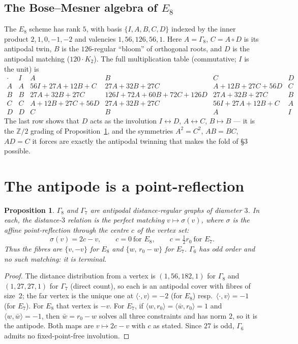 \documentclass[11pt]{article}
\newtheorem{proposition}{Proposition}
\theoremstyle{remark}
\newcommand{\ip}[2]{\langle #1,#2\rangle}
\begin{document}
\subsection*{The Bose--Mesner algebra of $E_8$}

The $E_8$ scheme has rank $5$, with basis $\{I,A,B,C,D\}$ indexed by the inner
product $2,1,0,-1,-2$ and valencies $1,56,126,56,1$. Here $A=\Gamma_8$,
$C=A\circ D$ is its antipodal twin, $B$ is the $126$-regular ``bloom'' of
orthogonal roots, and $D$ is the antipodal matching ($120\cdot K_2$). The full
multiplication table (commutative; $I$ is the unit) is
\[
\renewcommand{\arraystretch}{1.25}
\begin{array}{c|ccccc}
\cdot & I & A & B & C & D\\\hline
A & A & 56I{+}27A{+}12B{+}C & 27A{+}32B{+}27C & A{+}12B{+}27C{+}56D & C\\
B & B & 27A{+}32B{+}27C & 126I{+}72A{+}60B{+}72C{+}126D & 27A{+}32B{+}27C & B\\
C & C & A{+}12B{+}27C{+}56D & 27A{+}32B{+}27C & 56I{+}27A{+}12B{+}C & A\\
D & D & C & B & A & I
\end{array}
\]
The last row shows that $D$ acts as the involution $I\leftrightarrow D$,
$A\leftrightarrow C$, $B\mapsto B$ --- it is the $\mathbb Z/2$ grading of
Proposition~\ref{prop:anti}, and the symmetries $A^2=C^2$, $AB=BC$, $AD=C$ it
forces are exactly the antipodal twinning that makes the fold of \S3 possible.

\section{The antipode is a point-reflection}

\begin{proposition}\label{prop:anti}
$\Gamma_8$ and $\Gamma_7$ are antipodal distance-regular graphs of diameter $3$.
In each, the distance-$3$ relation is the perfect matching
$v\mapsto \sigma(v)$, where $\sigma$ is the affine point-reflection through the
centre $c$ of the vertex set:
\[
  \sigma(v)=2c-v,\qquad c=0 \ \text{for } E_8,\qquad c=\tfrac12 r_0 \ \text{for } E_7 .
\]
Thus the fibres are $\{v,-v\}$ for $E_8$ and $\{w,\,r_0-w\}$ for $E_7$.
$\Gamma_6$ has odd order and no such matching: it is terminal.
\end{proposition}

\begin{proof}
The distance distribution from a vertex is $(1,56,182,1)$ for $\Gamma_8$ and
$(1,27,27,1)$ for $\Gamma_7$ (direct count), so each is an antipodal cover with
fibres of size~$2$; the far vertex is the unique one at $\ip{\cdot}{v}=-2$ (for
$E_8$) resp.\ $\ip{\cdot}{v}=-1$ (for $E_7$). For $E_8$ that vertex is $-v$. For
$E_7$, if $\ip{w}{r_0}=\ip{\bar w}{r_0}=1$ and $\ip{w}{\bar w}=-1$, then
$\bar w=r_0-w$ solves all three constraints and has norm $2$, so it is the
antipode. Both maps are $v\mapsto 2c-v$ with $c$ as stated. Since $27$ is odd,
$\Gamma_6$ admits no fixed-point-free involution.
\end{proof}
\end{document}
